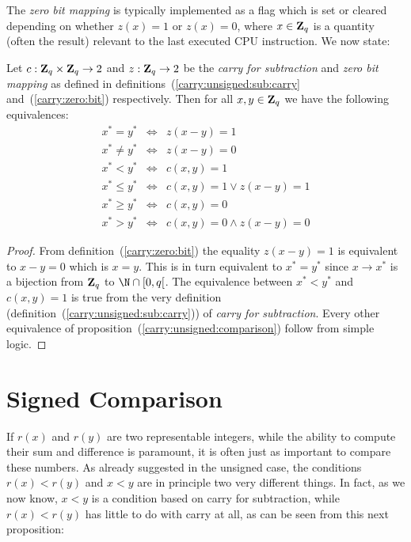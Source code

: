 \documentclass{article}
\newcommand{\zq}{\mbox{${\bf Z}_{q}$}}
\begin{document}
The {\em zero bit mapping} is typically implemented as a flag which is set
or cleared depending on whether $z(x)=1$ or $z(x)=0$, where $x\in\zq$ is 
a quantity (often the result) relevant to the last executed CPU instruction. 
We now state:

\begin{prop}\label{carry:unsigned:comparison}
  Let $c:\zq\times\zq\rightarrow 2$ and $z:\zq\rightarrow 2$ be the {\em carry 
  for subtraction} and {\em zero bit mapping} as defined 
  in definitions~(\ref{carry:unsigned:sub:carry} and~(\ref{carry:zero:bit}) 
  respectively. Then for all $x,y\in\zq$ we have the following equivalences:
    \begin{eqnarray*}
      x^{*} = y^{*}&\Leftrightarrow&z(x-y)=1\\ 
      x^{*}\neq y^{*}&\Leftrightarrow&z(x-y)=0\\
      x^{*} < y^{*}&\Leftrightarrow&c(x,y)=1\\
      x^{*}\leq y^{*}&\Leftrightarrow&c(x,y)=1\lor z(x-y)=1\\
      x^{*}\geq y^{*}&\Leftrightarrow &c(x,y)=0\\
      x^{*}>y^{*}&\Leftrightarrow& c(x,y)=0 \land z(x-y)=0
    \end{eqnarray*}
\end{prop}
\begin{proof}
  From definition~(\ref{carry:zero:bit}) the equality $z(x-y)=1$ is equivalent
  to $x-y=0$ which is $x=y$. This is in turn equivalent to $x^{*}=y^{*}$ since
  $x\rightarrow x^{*}$ is a bijection from $\zq$ to $\N\cap[0,q[$. The 
  equivalence between $x^{*}<y^{*}$ and $c(x,y)=1$ is true from the very
  definition (definition~(\ref{carry:unsigned:sub:carry})) of {\em carry
  for subtraction}. Every other equivalence of 
  proposition~(\ref{carry:unsigned:comparison}) follow from simple logic.
\end{proof}

\section{Signed Comparison}
If $r(x)$ and $r(y)$ are two representable integers, while the ability 
to compute their sum and difference is paramount, it is often just as 
important to compare these numbers. As already suggested in the unsigned
case, the conditions $r(x)<r(y)$ and $x<y$ are in principle two very
different things. In fact, as we now know, $x<y$ is a condition based
on carry for subtraction, while $r(x)<r(y)$ has
little to do with carry at all, as can be seen from this next proposition:
\end{document}
